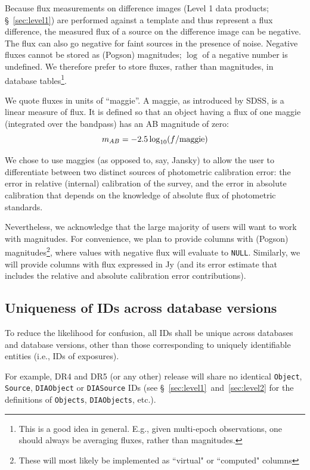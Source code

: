 \documentclass[12pt]{article}
\newcommand{\code}[1]{\texttt{#1}}
\newcommand{\DIASource}{\code{DIASource}\xspace}
\newcommand{\DIAObject}{\code{DIAObject}\xspace}
\newcommand{\DIAObjects}{\code{DIAObjects}\xspace}
\newcommand{\Object}{\code{Object}\xspace}
\newcommand{\Objects}{\code{Objects}\xspace}
\newcommand{\Source}{\code{Source}\xspace}
\begin{document}
Because flux measurements on difference images (Level 1 data products; \S~\ref{sec:level1}) are performed against a template
and thus represent a flux difference, the measured flux of a source on the difference image can be negative. The flux can also go negative for faint sources in the presence of noise. Negative fluxes cannot be stored as (Pogson) magnitudes; $\log$ of a negative number is undefined. We therefore prefer to store fluxes, rather than magnitudes, in database tables\footnote{This is a good idea in general. E.g., given multi-epoch observations, one should always be averaging fluxes, rather than magnitudes.}.

We quote fluxes in units of ``maggie''. A maggie, as introduced by SDSS, is a linear measure of flux. It is defined so that an object having a flux of one maggie (integrated over the bandpass) has an AB magnitude of zero:
\begin{equation}
    m_{AB} = -2.5 \log_{10}(f/{\rm maggie})
\end{equation}

We chose to use maggies (as opposed to, say, Jansky) to allow the user to differentiate between two distinct sources of photometric calibration error: the error in relative (internal) calibration of the survey, and the error in absolute calibration that depends on the knowledge of absolute flux of photometric standards.

\vspace{1em}
Nevertheless, we acknowledge that the large majority of users will want to work with magnitudes. For convenience, we plan to provide columns with (Pogson) magnitudes\footnote{These will most likely be implemented as ``virtual" or ``computed" columns}, where values with negative flux will evaluate to \code{NULL}. Similarly, we will provide columns with flux expressed in Jy (and its error estimate that includes the relative and absolute calibration error contributions).

\subsection{Uniqueness of IDs across database versions}

To reduce the likelihood for confusion, all IDs shall be unique across databases and database versions, other than those corresponding to uniquely identifiable entities (i.e., IDs of exposures).

For example, DR4 and DR5 (or any other) release will share no identical \Object, \Source, \DIAObject or \DIASource IDs (see \S~\ref{sec:level1}~and~\ref{sec:level2} for the definitions of \Objects, \DIAObjects, etc.).
\end{document}
